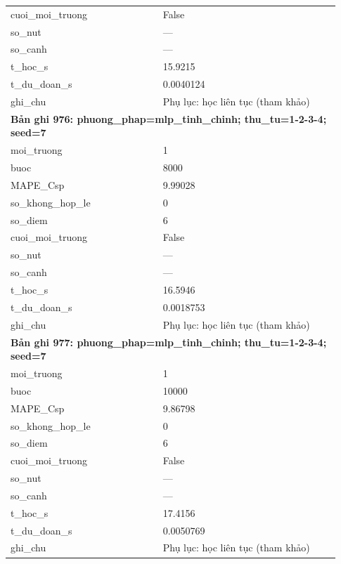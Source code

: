 \begin{longtable}{p{0.43\linewidth}p{0.50\linewidth}}
cuoi\_\allowbreak moi\_\allowbreak truong & False \\
so\_\allowbreak nut & — \\
so\_\allowbreak canh & — \\
t\_\allowbreak hoc\_\allowbreak s & 15.9215 \\
t\_\allowbreak du\_\allowbreak doan\_\allowbreak s & 0.0040124 \\
ghi\_\allowbreak chu & Phụ lục: học liên tục (tham khảo) \\
\midrule
\multicolumn{2}{p{0.95\linewidth}}{\textbf{Bản ghi 976: phuong\_phap=mlp\_tinh\_chinh; thu\_tu=1-2-3-4; seed=7}} \\
moi\_\allowbreak truong & 1 \\
buoc & 8000 \\
MAPE\_\allowbreak Csp & 9.99028 \\
so\_\allowbreak khong\_\allowbreak hop\_\allowbreak le & 0 \\
so\_\allowbreak diem & 6 \\
cuoi\_\allowbreak moi\_\allowbreak truong & False \\
so\_\allowbreak nut & — \\
so\_\allowbreak canh & — \\
t\_\allowbreak hoc\_\allowbreak s & 16.5946 \\
t\_\allowbreak du\_\allowbreak doan\_\allowbreak s & 0.0018753 \\
ghi\_\allowbreak chu & Phụ lục: học liên tục (tham khảo) \\
\midrule
\multicolumn{2}{p{0.95\linewidth}}{\textbf{Bản ghi 977: phuong\_phap=mlp\_tinh\_chinh; thu\_tu=1-2-3-4; seed=7}} \\
moi\_\allowbreak truong & 1 \\
buoc & 10000 \\
MAPE\_\allowbreak Csp & 9.86798 \\
so\_\allowbreak khong\_\allowbreak hop\_\allowbreak le & 0 \\
so\_\allowbreak diem & 6 \\
cuoi\_\allowbreak moi\_\allowbreak truong & False \\
so\_\allowbreak nut & — \\
so\_\allowbreak canh & — \\
t\_\allowbreak hoc\_\allowbreak s & 17.4156 \\
t\_\allowbreak du\_\allowbreak doan\_\allowbreak s & 0.0050769 \\
ghi\_\allowbreak chu & Phụ lục: học liên tục (tham khảo) \\

\end{longtable}
